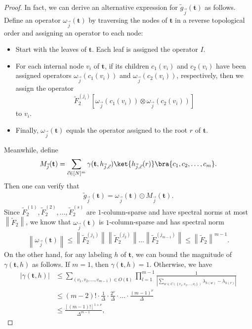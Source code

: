 \documentclass[superscriptaddress,onecolumn,nofootinbib,longbibliography,a4paper,accepted=2026-09-29]{quantumarticle}
\theoremstyle{plain}
\theoremstyle{definition}
\numberwithin{thm}{section}
\numberwithin{assumption}{section}
\numberwithin{lemma}{section}
\numberwithin{prop}{section}
\numberwithin{cor}{section}
\numberwithin{definition}{section}
\numberwithin{rmk}{section}
\numberwithin{equation}{section}
\newcommand{\abs}[1]      {\left| #1 \right|}
\newcommand{\norm}[1]     {\left\| #1 \right\|}
\newcommand{\lrsb}[1]{\left [ #1 \right ]}
\newcommand{\lrcb}[1]{\left \{ #1 \right \}}
\newcommand{\mbt}{\mathbf{t}}
\begin{document}
\begin{proof}
In fact, we can derive an alternative expression for $\tilde{g}_{\vec j}(\mbt)$ as follows.
Define an operator $\omega_{\vec j}(\mbt)$ by traversing the nodes of $\mbt$ in a reverse topological order and assigning an operator to each node:
\begin{itemize}
    \item Start with the leaves of $\mbt$. Each leaf is assigned the operator $I$.
    \item For each internal node $v_i$ of $\mbt$, if its children $c_1(v_i)$ and $c_2(v_i)$ have been assigned operators $\omega_{\vec j}(c_1(v_i))$ and 
    $\omega_{\vec j}(c_2(v_i))$, respectively, then we assign the operator $$\tilde{F}_2^{(j_i)} \lrsb{\omega_{\vec j}(c_1(v_i)) \otimes \omega_{\vec j}(c_2(v_i))}$$ 
    to $v_i$.
    \item Finally, $\omega_{\vec j}(\mbt)$ equals the operator assigned to the root $r$ of $\mbt$.
\end{itemize}
Meanwhile, define  
\begin{align}
    M_{\vec j}(\mbt) = \sum_{\vec c \in [N]^m} \gamma(\mbt, h_{\vec j, \vec c}) \ket{h_{\vec j, \vec c}(r)}\bra{c_1,c_2,\dots,c_m}.
\end{align}
Then one can verify that
\begin{align}
    \tilde{g}_{\vec j}(\mbt) = \omega_{\vec j}(\mbt) \odot M_{\vec j}(\mbt).
\end{align}
Since $\tilde{F}_2^{(1)}, \tilde{F}_2^{(2)}, \dots, \tilde{F}_2^{(s)}$ are $1$-column-sparse and have spectral norms at most $\norm{\tilde{F}_2}$, we know that $\omega_{\vec j}(\mbt)$ is 
$1$-column-sparse and has spectral norm
\begin{align}
    \norm{\omega_{\vec j}(\mbt)} \le \norm{\tilde{F}_2^{(j_1)}}\norm{\tilde{F}_2^{(j_2)}}\dots \norm{\tilde{F}_2^{(j_{m-1})}} \le \norm{\tilde{F}_2}^{m-1}.
\end{align}
On the other hand, for any labeling $h$ of $\mbt$, we can bound the magnitude of $\gamma(\mbt, h)$ as follows. If $m=1$, then $\gamma(\mbt, h)=1$. Otherwise, we have
\begin{align}
\abs{\gamma(\mbt, h)} &\le  \sum_{(v_1,v_2,\dots,v_{m-1}) \in O(\mbt)} \prod_{l=1}^{m-1}\frac{1}{\abs{\sum_{w \in C(\lrcb{v_1,v_2,\dots,v_l})} \lambda_{h(w)} -\lambda_{h(r)}}} \\
&\le (m-2)! \cdot \frac{1}{\Delta} \cdot \frac{2^{\nu}}{\Delta}  \cdot \dots \cdot 
\frac{(m-1)^{\nu}}{\Delta} \\
&\le \frac{[(m-1)!]^{1+\nu}}{\Delta^{m-1}},
\end{align}

\end{proof}
\end{document}
